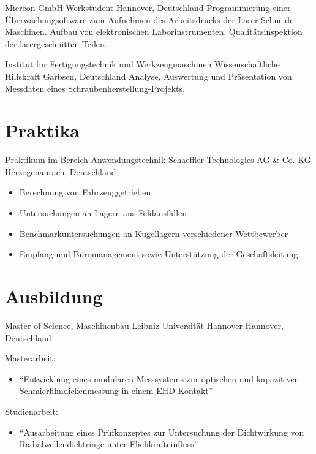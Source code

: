 \documentclass[11pt,a4paper,sans]{moderncv}
\begin{document}
{Micreon GmbH}
{Werkstudent}
{Hannover, Deutschland}
{}
{
Programmierung einer Überwachungsoftware zum Aufnehmen des Arbeitsdrucks der Laser-Schneide-Maschinen.
Aufbau von elektronischen Laborinstrumenten.
Qualitätsinspektion der lasergeschnitten Teilen.
}

{Institut für Fertigungstechnik und Werkzeugmaschinen}
{Wissenschaftliche Hilfskraft}
{Garbsen, Deutschland}
{}
{
Analyse, Auswertung und Präsentation von Messdaten eines Schraubenherstellung-Projekts.
}

\section{\textbf{Praktika}}
{Praktikum im Bereich Anwendungstechnik}
{Schaeffler Technologies AG \& Co. KG}
{Herzogenaurach, Deutschland}
{}
{
    \begin{itemize}
        \item Berechnung von Fahrzeuggetrieben
        \item Untersuchungen an Lagern aus Feldausfällen
        \item Benchmarkuntersuchungen an Kugellagern verschiedener Wettbewerber
        \item Empfang und Büromanagement sowie Unterstützung der Geschäftsleitung
    \end{itemize}
}

\section{\textbf{Ausbildung}}

{Master of Science, Maschinenbau}
{Leibniz Universität Hannover}
{Hannover, Deutschland}
{}
{
    Masterarbeit:
    \begin{itemize}
        \item ``Entwicklung eines modularen Messsystems zur optischen und kapazitiven Schmierfilmdickenmessung in einem EHD-Kontakt''
    \end{itemize}
    Studienarbeit:
    \begin{itemize}
        \item "`Ausarbeitung eines Prüfkonzeptes zur Untersuchung der Dichtwirkung von Radialwellendichtringe unter Fliehkrafteinfluss"'
    \end{itemize}
}
\end{document}
